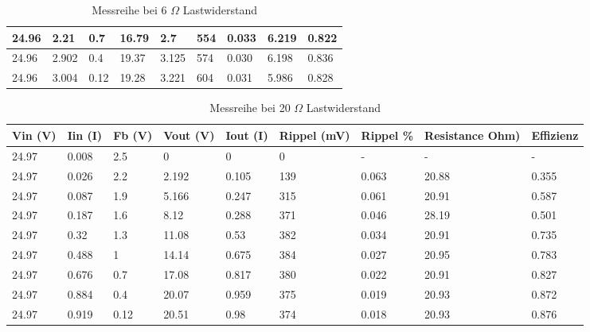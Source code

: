\begin{table}[h]
\begin{tabular}{|l|l|l|l|l|l|l|l|l|}
24.96                         & 2.21                         & 0.7                         & 16.79                         & 2.7                           & 554                              & 0.033                          & 6.219                                & 0.822                          \\ \hline
24.96                         & 2.902                        & 0.4                         & 19.37                         & 3.125                         & 574                              & 0.030                          & 6.198                                & 0.836                          \\ \hline
24.96                         & 3.004                        & 0.12                        & 19.28                         & 3.221                         & 604                              & 0.031                          & 5.986                                & 0.828                          \\ \hline
\end{tabular}
\caption{Messreihe bei 6 $\Omega$ Lastwiderstand}
\end{table}

\begin{table}[h]
\centering
\begin{tabular}{|l|l|l|l|l|l|l|l|l|}
\hline
Vin (V) & Iin (I) & Fb (V) & Vout (V) & Iout (I) & Rippel (mV) & Rippel \% & Resistance Ohm) & Effizienz \\ \hline
24.97 & 0.008 & 2.5 & 0 & 0 & 0 & - & - & - \\ \hline
24.97 & 0.026 & 2.2 & 2.192 & 0.105 & 139 & 0.063 & 20.88 & 0.355 \\ \hline
24.97 & 0.087 & 1.9 & 5.166 & 0.247 & 315 & 0.061 & 20.91 & 0.587 \\ \hline
24.97 & 0.187 & 1.6 & 8.12 & 0.288 & 371 & 0.046 & 28.19 & 0.501 \\ \hline
24.97 & 0.32 & 1.3 & 11.08 & 0.53 & 382 & 0.034 & 20.91 & 0.735 \\ \hline
24.97 & 0.488 & 1 & 14.14 & 0.675 & 384 & 0.027 & 20.95 & 0.783 \\ \hline
24.97 & 0.676 & 0.7 & 17.08 & 0.817 & 380 & 0.022 & 20.91 & 0.827 \\ \hline
24.97 & 0.884 & 0.4 & 20.07 & 0.959 & 375 & 0.019 & 20.93 & 0.872 \\ \hline
24.97 & 0.919 & 0.12 & 20.51 & 0.98 & 374 & 0.018 & 20.93 & 0.876 \\ \hline
\end{tabular}
\caption{Messreihe bei 20 $\Omega$ Lastwiderstand}
\label{fig::Res20}
\end{table}

